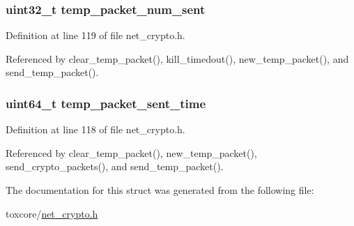 \hypertarget{struct_crypto___connection_a7386b7ad7bedb9dd47d898f588b4f463}{
\subsubsection[{temp\+\_\+packet\+\_\+num\+\_\+sent}]{\setlength{\rightskip}{0pt plus 5cm}uint32\+\_\+t temp\+\_\+packet\+\_\+num\+\_\+sent}}\label{struct_crypto___connection_a7386b7ad7bedb9dd47d898f588b4f463}


Definition at line 119 of file net\+\_\+crypto.\+h.



Referenced by clear\+\_\+temp\+\_\+packet(), kill\+\_\+timedout(), new\+\_\+temp\+\_\+packet(), and send\+\_\+temp\+\_\+packet().

\hypertarget{struct_crypto___connection_abb5fdaef769d667f90bc97bd72d765d6}{
\subsubsection[{temp\+\_\+packet\+\_\+sent\+\_\+time}]{\setlength{\rightskip}{0pt plus 5cm}uint64\+\_\+t temp\+\_\+packet\+\_\+sent\+\_\+time}}\label{struct_crypto___connection_abb5fdaef769d667f90bc97bd72d765d6}


Definition at line 118 of file net\+\_\+crypto.\+h.



Referenced by clear\+\_\+temp\+\_\+packet(), new\+\_\+temp\+\_\+packet(), send\+\_\+crypto\+\_\+packets(), and send\+\_\+temp\+\_\+packet().



The documentation for this struct was generated from the following file\+:\begin{DoxyCompactItemize}
\item 
toxcore/\hyperlink{net__crypto_8h}{net\+\_\+crypto.\+h}\end{DoxyCompactItemize}
